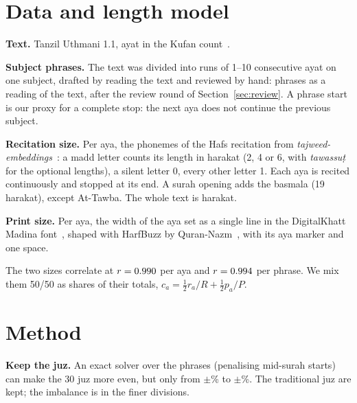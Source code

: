 \documentclass[conference]{IEEEtran}
\begin{document}
\section{Data and length model}\label{sec:data}
\textbf{Text.} Tanzil Uthmani 1.1, \Ayat{} ayat in the Kufan count~\cite{tanzil}.

\textbf{Subject phrases.} The text was divided into runs of 1--10 consecutive ayat on one subject,
drafted by reading the text and reviewed by hand: \PhrasesReading{} phrases as a reading of the
text, \Phrases{} after the review round of Section~\ref{sec:review}. A phrase start is our proxy
for a complete stop: the next aya does not continue the previous subject.

\textbf{Recitation size.} Per aya, the phonemes of the Hafs recitation from
\emph{tajweed-embeddings}~\cite{tajemb}: a madd letter counts its length in harakat (2, 4 or 6,
with \emph{tawassuṭ} for the optional lengths), a silent letter 0, every other letter 1. Each aya
is recited continuously and stopped at its end. A surah opening adds the basmala (19 harakat),
except At-Tawba. The whole text is \RecitationTotal{} harakat.

\textbf{Print size.} Per aya, the width of the aya set as a single line in the DigitalKhatt
Madina font~\cite{digitalkhatt}, shaped with HarfBuzz by Quran-Nazm~\cite{nazm}, with its aya
marker and one space.

The two sizes correlate at $r=0.990$ per aya and $r=0.994$ per phrase. We mix them
50/50 as shares of their totals, $c_a = \tfrac12 r_a/R + \tfrac12 p_a/P$.

\section{Method}
\textbf{Keep the juz.} An exact solver over the phrases (penalising mid-surah starts) can make the
30 juz more even, but only from $\pm$\TradJuzWorst\% to $\pm$\OptJuzWorst\%. The traditional juz are
kept; the imbalance is in the finer divisions.
\end{document}
